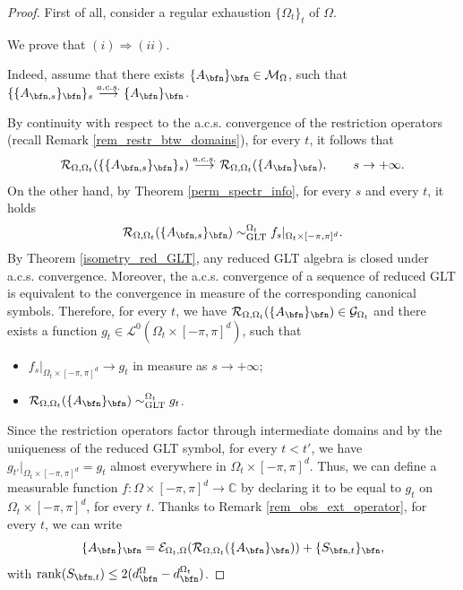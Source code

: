 \documentclass{amsart}
\begin{document}
\begin{proof}First of all, consider a regular exhaustion $\{\Omega_t\}_t$ of $\Omega$.

     We prove that $(i)\Rightarrow(ii)$. 
    
    Indeed, assume that there exists $\{A_\bfn\}_\bfn\in\mathcal{M}_\Omega$, such that $\{\{A_{\bfn,s}\}_\bfn\}_s\overset{a.c.s.}{\longrightarrow}\{A_\bfn\}_\bfn$.

    By continuity with respect to the a.c.s. convergence of the restriction operators (recall Remark \ref{rem_restr_btw_domains}), for every $t$, it follows that
    \begin{equation*}
        \mathcal{R}_{\Omega,\Omega_t}(\{\{A_{\bfn,s}\}_\bfn\}_s)\overset{a.c.s.}{\longrightarrow}\mathcal{R}_{\Omega,\Omega_t}(\{A_\bfn\}_\bfn),\qquad s\to+\infty.
    \end{equation*}
    On the other hand, by Theorem \ref{perm_spectr_info}, for every $s$ and every $t$, it holds 
    \begin{equation*}
        \mathcal{R}_{\Omega,\Omega_t}(\{A_{\bfn,s}\}_\bfn)\sim_{\mathrm{GLT}}^{\Omega_t}f_s|_{\Omega_t\times[-\pi,\pi]^d}.
    \end{equation*}
    By Theorem \ref{isometry_red_GLT}, any reduced GLT algebra is closed under a.c.s. convergence. Moreover, the a.c.s. convergence of a sequence of reduced GLT is equivalent to the convergence in measure of the corresponding canonical symbols. Therefore, for every $t$, we have $\mathcal{R}_{\Omega,\Omega_t}(\{A_\bfn\}_\bfn)\in\mathcal{G}_{\Omega_t}$ and there exists a function $g_t\in\mathcal{L}^0(\Omega_t\times[-\pi,\pi]^d)$, such that
    \begin{itemize}
        \item $f_s|_{\Omega_t\times[-\pi,\pi]^d}\to g_t$ in measure as $s\to +\infty$;
        \item $\mathcal{R}_{\Omega,\Omega_t}(\{A_\bfn\}_\bfn)\sim_{\mathrm{GLT}}^{\Omega_t}g_t$.
    \end{itemize}
    Since the restriction operators factor through intermediate domains and by the uniqueness of the reduced GLT symbol, for every $t<t'$, we have $g_{t'}|_{\Omega_{t}\times[-\pi,\pi]^d}=g_t$ almost everywhere in $\Omega_t\times[-\pi,\pi]^d$. Thus, we can define a measurable function $f:\Omega\times[-\pi,\pi]^d\to\mathbb{C}$ by declaring it to be equal to $g_t$ on $\Omega_t\times[-\pi,\pi]^d$, for every $t$. 
    Thanks to Remark \ref{rem_obs_ext_operator}, for every $t$, we can write 
    \begin{equation*}
        \{A_{\bfn}\}_\bfn=\mathcal{E}_{\Omega_t,\Omega}(\mathcal{R}_{\Omega,\Omega_t}(\{A_{\bfn}\}_\bfn))+\{S_{\bfn,t}\}_\bfn,
    \end{equation*}
    with $\mathrm{rank}(S_{\bfn,t})\leq 2(d_{\bfn}^{\Omega}-d_\bfn^{\Omega_t})$.
    

\end{proof}
\end{document}
